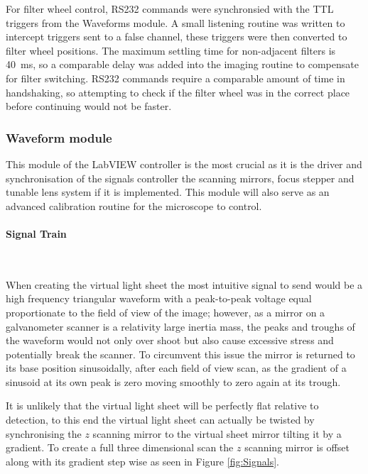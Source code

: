 For filter wheel control, RS232 commands were synchronsied with the TTL triggers from the Waveforms module.
A small listening routine was written to intercept triggers sent to a false channel, these triggers were then converted to filter wheel positions.
The maximum settling time for non-adjacent filters is \SI{40}{\milli\second}, so a comparable delay was added into the imaging routine to compensate for filter switching.
RS232 commands require a comparable amount of time in handshaking, so attempting to check if the filter wheel was in the correct place before continuing would not be faster.
%

\subsubsection{Waveform module}

This module of the LabVIEW controller is the most crucial as it is the driver and synchronisation of the signals controller the scanning mirrors, focus stepper and tunable lens system if it is implemented.
This module will also serve as an advanced calibration routine for the microscope to control.

\paragraph{Signal Train}~

When creating the virtual light sheet the most intuitive signal to send would be a high frequency triangular waveform with a peak-to-peak voltage equal proportionate to the field of view of the image; however, as a mirror on a galvanometer scanner is a relativity large inertia mass, the peaks and troughs of the waveform would not only over shoot but also cause excessive stress and potentially break the scanner.
To circumvent this issue the mirror is returned to its base position sinusoidally, after each field of view scan, as the gradient of a sinusoid at its own peak is zero moving smoothly to zero again at its trough.

It is unlikely that the virtual light sheet will be perfectly flat relative to detection, to this end the virtual light sheet can actually be twisted by synchronising the $z$ scanning mirror to the virtual sheet mirror tilting it by a gradient.
To create a full three dimensional scan the $z$ scanning mirror is offset along with its gradient step wise as seen in Figure \ref{fig:Signals}.

